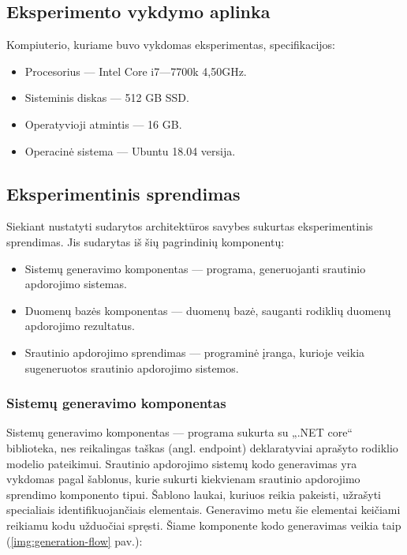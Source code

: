 \documentclass{VUMIFPSbakalaurinis}
\begin{document}
\subsection{Eksperimento vykdymo aplinka}

Kompiuterio, kuriame buvo vykdomas eksperimentas, specifikacijos:
\begin{itemize}
    \item Procesorius — Intel Core i7—7700k 4,50GHz.
    \item Sisteminis diskas —  512 GB SSD.
    \item Operatyvioji atmintis — 16 GB.
    \item Operacinė sistema — Ubuntu 18.04 versija.
\end{itemize}

\subsection{Eksperimentinis sprendimas}

Siekiant nustatyti sudarytos architektūros savybes sukurtas eksperimentinis sprendimas. Jis sudarytas iš šių pagrindinių komponentų:
\begin{itemize}
    \item Sistemų generavimo komponentas — programa, generuojanti srautinio apdorojimo sistemas.
    \item Duomenų bazės komponentas — duomenų bazė, sauganti rodiklių duomenų apdorojimo rezultatus.
    \item Srautinio apdorojimo sprendimas — programinė įranga, kurioje veikia sugeneruotos srautinio apdorojimo sistemos.
\end{itemize}


\subsubsection{Sistemų generavimo komponentas}

Sistemų generavimo komponentas — programa sukurta su „.NET core“ biblioteka, nes reikalingas taškas (angl. endpoint) deklaratyviai aprašyto rodiklio modelio pateikimui. Srautinio apdorojimo sistemų kodo generavimas yra vykdomas pagal šablonus, kurie sukurti kiekvienam srautinio apdorojimo sprendimo komponento tipui. Šablono laukai, kuriuos reikia pakeisti, užrašyti specialiais identifikuojančiais elementais. Generavimo metu šie elementai keičiami reikiamu kodu užduočiai spręsti.
Šiame komponente kodo generavimas veikia taip (\ref{img:generation-flow} pav.):
\end{document}
